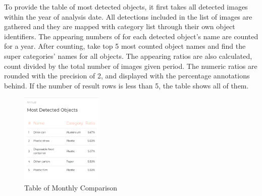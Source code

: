 \documentclass[conference]{IEEEtran}
\begin{document}
To provide the table of most detected objects, it first takes all detected images within the year of analysis date. All detections included in the list of images are gathered and they are mapped with category list through their own object identifiers. The appearing numbers of for each detected object's name are counted for a year. After counting, take top 5 most counted object names and find the super categories' names for all objects. The appearing ratios are also calculated, count divided by the total number of images given period. The numeric ratios are rounded with the precision of 2, and displayed with the percentage annotations behind. If the number of result rows is less than 5, the table shows all of them.\\

\begin{figure}[h]
    \centering
    \includegraphics[width=0.35\textwidth]{images/dashboard_ann_table.eps}
    \caption{Table of Monthly Comparison}
\end{figure}
\end{document}
